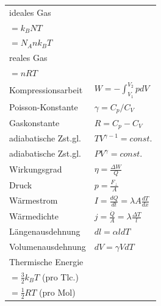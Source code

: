 \documentclass[12pt,a4paper]{article}
\renewcommand{\=}[1]{\stackrel{#1}{=}}
\theoremstyle{definition}
\theoremstyle{remark}
\begin{document}
\begin{center}
\begin{minipage}[t]{.45\linewidth}
\vspace{0pt}

\begin{tabular}{ll}
ideales Gas & \makecell[l]{$\boxed{pV = nRT}$ \\$ = k_B N T $\\$= N_A n k_B T$}\\
reales Gas & \makecell[l]{$(p+\frac{an^2}{V^2} (V - bn)$\\$= nRT$}\\
Kompressionsarbeit & $W = -\int_{V_1}^{V_2} p dV$\\
Poisson-Konstante & $\gamma = C_p / C_V$\\
Gaskonstante & $R = C_p - C_V$\\
adiabatische Zst.gl. & $TV^{\gamma-1} = const.$\\
adiabatische Zst.gl. & $PV^{\gamma} = const.$\\
Wirkungsgrad & $\eta = \frac{\Delta W}{Q}$\\
Druck & $p = \frac{F_{\perp}}{A}$\\
Wärmestrom & $I = \frac{dQ}{dt} = \lambda A \frac{dT}{dx}$\\
Wärmedichte & $j = \frac{\dot{Q}}{A} = \lambda \frac{\Delta T}{l}$\\
Längenausdehnung & $dl = \alpha l dT$\\
Volumenausdehnung & $dV = \gamma V dT$\\
Thermische Energie & \makecell[l]{$E_{kin} = \frac{1}{2} m \bar{v}^2$\\ $= \frac{3}{2} k_B T$ {\scriptsize (pro Tlc.)} \\
$= \frac{1}{2} R T$ {\scriptsize (pro Mol)}}\\
\end{tabular}


\end{minipage}%
\begin{minipage}[t]{.55\linewidth}
\vspace{0pt}
\centering


\end{minipage}
\end{center}
\end{document}
